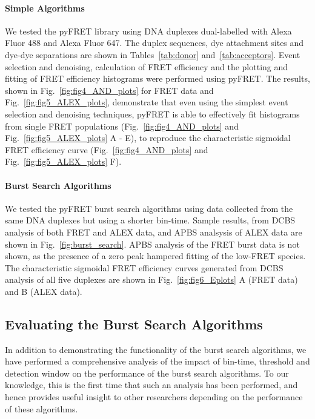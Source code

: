 \documentclass[10pt]{article}
\begin{document}
\paragraph{Simple Algorithms}
We tested the pyFRET library using DNA duplexes dual-labelled with Alexa Fluor 488 and Alexa Fluor 647. The duplex sequences, dye attachment sites and dye-dye separations are shown in Tables~\ref{tab:donor} and~\ref{tab:acceptors}. Event selection and denoising, calculation of FRET efficiency and the plotting and fitting of FRET efficiency histograms were performed using pyFRET. The results, shown in Fig.~\ref{fig:fig4_AND_plots} for FRET data and Fig.~\ref{fig:fig5_ALEX_plots}, demonstrate that even using the simplest event selection and denoising techniques, pyFRET is able to effectively fit histograms from single FRET populations (Fig.~\ref{fig:fig4_AND_plots} and Fig.~\ref{fig:fig5_ALEX_plots} A - E), to reproduce the characteristic sigmoidal FRET efficiency curve (Fig.~\ref{fig:fig4_AND_plots} and Fig.~\ref{fig:fig5_ALEX_plots} F).

\paragraph{Burst Search Algorithms}
We tested the pyFRET burst search algorithms using data collected from the same DNA duplexes but using a shorter bin-time. Sample results, from DCBS analysis of both FRET and ALEX data, and APBS analsysis of ALEX data are shown in Fig.~\ref{fig:burst_search}. APBS analysis of the FRET burst data is not shown, as the presence of a zero peak hampered fitting of the low-FRET species. The characteristic sigmoidal FRET efficiency curves generated from DCBS analysis of all five duplexes are shown in Fig.~\ref{fig:fig6_Eplots} A (FRET data) and B (ALEX data).

\subsection*{Evaluating the Burst Search Algorithms}
In addition to demonstrating the functionality of the burst search algorithms, we have performed a comprehensive analysis of the impact of bin-time, threshold and detection window on the performance of the burst search algorithms. To our knowledge, this is the first time that such an analysis has been performed, and hence provides useful insight to other researchers depending on the performance of these algorithms.
\end{document}
